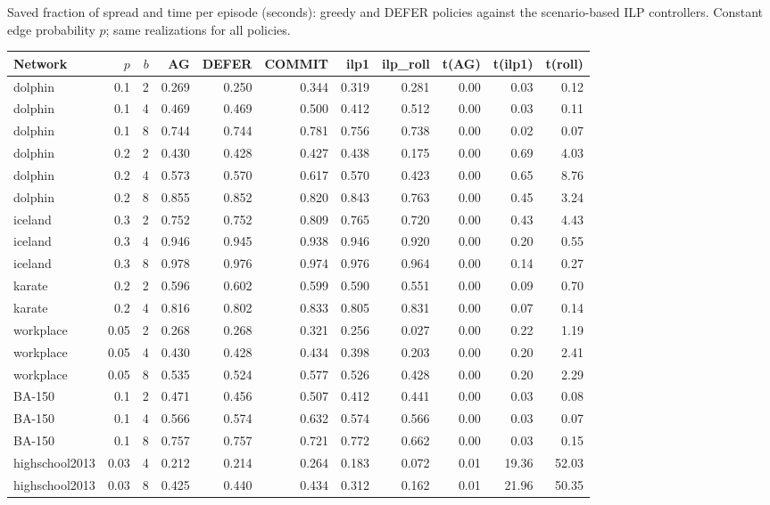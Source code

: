 \documentclass[ijoc,sglanonrev]{informs4}
\begin{document}
\begin{table}[h]
\TABLE
{Saved fraction of spread and time per episode (seconds): greedy and DEFER
policies against the scenario-based ILP controllers. Constant edge probability
$p$; same realizations for all policies.\label{tab:ilp}}
{\footnotesize
\begin{tabular}{lrrrrrrrrrr}
\hline
Network & $p$ & $b$ & AG & DEFER & COMMIT & ilp1 & ilp\_roll & t(AG) & t(ilp1) & t(roll)\\
\hline
dolphin & 0.1 & 2 & 0.269 & 0.250 & 0.344 & 0.319 & 0.281 & 0.00 & 0.03 & 0.12 \\
dolphin & 0.1 & 4 & 0.469 & 0.469 & 0.500 & 0.412 & 0.512 & 0.00 & 0.03 & 0.11 \\
dolphin & 0.1 & 8 & 0.744 & 0.744 & 0.781 & 0.756 & 0.738 & 0.00 & 0.02 & 0.07 \\
dolphin & 0.2 & 2 & 0.430 & 0.428 & 0.427 & 0.438 & 0.175 & 0.00 & 0.69 & 4.03 \\
dolphin & 0.2 & 4 & 0.573 & 0.570 & 0.617 & 0.570 & 0.423 & 0.00 & 0.65 & 8.76 \\
dolphin & 0.2 & 8 & 0.855 & 0.852 & 0.820 & 0.843 & 0.763 & 0.00 & 0.45 & 3.24 \\
iceland & 0.3 & 2 & 0.752 & 0.752 & 0.809 & 0.765 & 0.720 & 0.00 & 0.43 & 4.43 \\
iceland & 0.3 & 4 & 0.946 & 0.945 & 0.938 & 0.946 & 0.920 & 0.00 & 0.20 & 0.55 \\
iceland & 0.3 & 8 & 0.978 & 0.976 & 0.974 & 0.976 & 0.964 & 0.00 & 0.14 & 0.27 \\
karate & 0.2 & 2 & 0.596 & 0.602 & 0.599 & 0.590 & 0.551 & 0.00 & 0.09 & 0.70 \\
karate & 0.2 & 4 & 0.816 & 0.802 & 0.833 & 0.805 & 0.831 & 0.00 & 0.07 & 0.14 \\
workplace & 0.05 & 2 & 0.268 & 0.268 & 0.321 & 0.256 & 0.027 & 0.00 & 0.22 & 1.19 \\
workplace & 0.05 & 4 & 0.430 & 0.428 & 0.434 & 0.398 & 0.203 & 0.00 & 0.20 & 2.41 \\
workplace & 0.05 & 8 & 0.535 & 0.524 & 0.577 & 0.526 & 0.428 & 0.00 & 0.20 & 2.29 \\
BA-150 & 0.1 & 2 & 0.471 & 0.456 & 0.507 & 0.412 & 0.441 & 0.00 & 0.03 & 0.08 \\
BA-150 & 0.1 & 4 & 0.566 & 0.574 & 0.632 & 0.574 & 0.566 & 0.00 & 0.03 & 0.07 \\
BA-150 & 0.1 & 8 & 0.757 & 0.757 & 0.721 & 0.772 & 0.662 & 0.00 & 0.03 & 0.15 \\
highschool2013 & 0.03 & 4 & 0.212 & 0.214 & 0.264 & 0.183 & 0.072 & 0.01 & 19.36 & 52.03 \\
highschool2013 & 0.03 & 8 & 0.425 & 0.440 & 0.434 & 0.312 & 0.162 & 0.01 & 21.96 & 50.35 \\
\hline
\end{tabular}}{}
\end{table}
\end{document}
